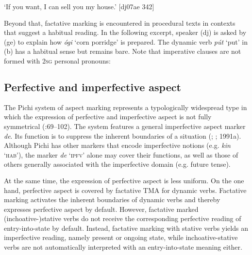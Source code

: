 \glt ‘If you want, I can sell you my house.’ [dj07ae 342]
\z

Beyond that, factative marking is encountered in procedural texts in contexts that suggest a habitual reading. In the following excerpt, speaker (dj) is asked by (ge) to explain how \textit{ógi} ‘corn porridge’ is prepared. The dynamic verb \textit{pút} ‘put’ in (b) has a habitual sense but remains bare. Note that imperative clauses are not formed with \textsc{2sg} personal pronouns:


\ea%
    \label{ex:key:322}
\z
\z

\subsection{Perfective and imperfective aspect}\label{sec:6.3.2}

The Pichi system of aspect marking represents a typologically widespread type in which the expression of perfective and imperfective aspect is not fully symmetrical (\citealt{Dahl1985}:69–102). The system features a general imperfective aspect marker \textit{de}. Its function is to suppress the inherent boundaries of a situation (\citealt{Breu1985}; \citealt{Sasse1991b}; 1991a). Although Pichi has other markers that encode imperfective notions (e.g. \textit{kin} ‘\textsc{hab}’), the marker \textit{de} ‘\textsc{ipfv}’ alone may cover their functions, as well as those of others generally associated with the imperfective domain (e.g. future tense). 


At the same time, the expression of perfective aspect is less uniform. On the one hand, perfective aspect is covered by factative TMA for dynamic verbs. Factative marking activates the inherent boundaries of dynamic verbs and thereby expresses perfective aspect by default. However, factative marked (inchoative-)stative verbs do not receive the corresponding perfective reading of entry-into-state by default. Instead, factative marking with stative verbs yields an imperfective reading, namely present or ongoing state, while inchoative-stative verbs are not automatically interpreted with an entry-into-state meaning either. 



